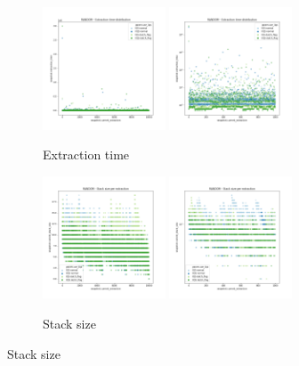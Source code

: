 \begin{figure}
    \begin{subfigure}[b]{\textwidth}
        \centering
        \includegraphics[width=0.40\textwidth]{./fragments/04_experimental_execution/images/02_basebenchmark_01_base_benchmark.png.1_0.png}
        \includegraphics[width=0.40\textwidth]{./fragments/04_experimental_execution/images/02_basebenchmark_01_base_benchmark.png.1_1.png}
        \caption{Extraction time}
        \label{FIG:PARTITION_SCHEME_01_SHUFFLED__0_0}
    \end{subfigure}

    \begin{subfigure}[b]{\textwidth}
        \centering
        \includegraphics[width=0.40\textwidth]{./fragments/04_experimental_execution/images/02_basebenchmark_01_base_benchmark.png.2_0.png}
        \includegraphics[width=0.40\textwidth]{./fragments/04_experimental_execution/images/02_basebenchmark_01_base_benchmark.png.2_1.png}
        \caption{Stack size}
        \label{FIG:PARTITION_SCHEME_01_SHUFFLED__0_0}
    \end{subfigure}
    

\end{figure}
